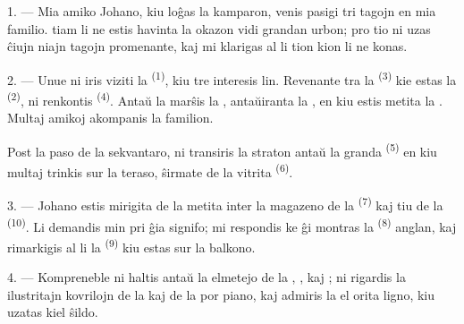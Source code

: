 
\VUsaut{4.0mm}
\VUsaut{3.0mm}

\VUsaut{3.0mm}

1. --- Mia amiko Johano, kiu loĝas la kamparon, venis pasigi tri tagojn en mia
familio.  tiam li ne estis havinta la okazon vidi grandan urbon; pro
tio ni uzas ĉiujn niajn tagojn promenante, kaj mi klarigas al li tion kion li
ne konas.

2. --- Unue ni iris viziti la  \textsuperscript{(1)}, kiu
tre interesis lin. Revenante tra la  \textsuperscript{(3)} kie
estas la  \textsuperscript{(2)}, ni renkontis
 \textsuperscript{(4)}. Antaŭ la 
marŝis la , antaŭiranta la , en kiu
estis metita la . Multaj amikoj akompanis la 
familion.

Post la paso de la sekvantaro, ni transiris la straton antaŭ la granda
 \textsuperscript{(5)} en kiu multaj  trinkis
 sur la teraso, ŝirmate de la vitrita 
\textsuperscript{(6)}.

3. --- Johano estis mirigita de la  metita inter la magazeno de la
 \textsuperscript{(7)} kaj tiu de la 
\textsuperscript{(10)}. Li demandis min pri ĝia signifo; mi respondis ke ĝi
montras la  \textsuperscript{(8)} anglan, kaj rimarkigis al
li la  \textsuperscript{(9)} kiu estas sur la balkono.

\VUsaut{3.0mm}

4. --- Kompreneble ni haltis antaŭ la elmetejo de la ,
,  kaj ; ni rigardis la
ilustritajn kovrilojn de la  kaj de la  por
piano, kaj admiris la  el orita ligno, kiu uzatas kiel ŝildo.

